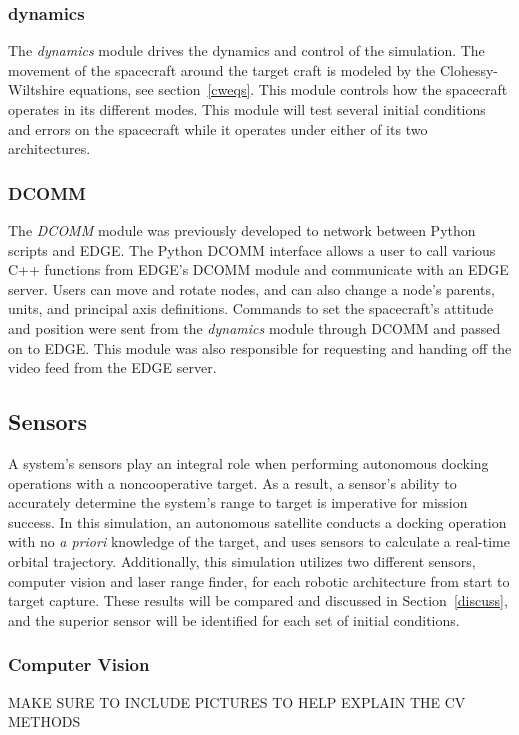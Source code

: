 \documentclass[journal, 10pt]{IEEEtran}
\begin{document}
\subsubsection{dynamics}
The \textit{dynamics} module drives the dynamics and control of the simulation. The movement of the spacecraft around the target craft is modeled by the Clohessy-Wiltshire equations, see section~\ref{cweqs}. This module controls how the spacecraft operates in its different modes. This module will test several initial conditions and errors on the spacecraft while it operates under either of its two architectures.

\subsubsection{DCOMM}
The \textit{DCOMM} module was previously developed to network between Python scripts and EDGE. The Python DCOMM interface allows a user to call various C++ functions from EDGE's DCOMM module and communicate with an EDGE server. Users can move and rotate nodes, and can also change a node's parents, units, and principal axis definitions. Commands to set the spacecraft's attitude and position were sent from the \textit{dynamics} module through DCOMM and passed on to EDGE. This module was also responsible for requesting and handing off the video feed from the EDGE server.

\subsection{Sensors}
A system's sensors play an integral role when performing autonomous docking operations with a noncooperative target. As a result, a sensor's ability to accurately determine the system's range to target is imperative for mission success. In this simulation, an autonomous satellite conducts a docking operation with no \textit{a priori} knowledge of the target, and uses sensors to calculate a real-time orbital trajectory. Additionally, this simulation utilizes two different sensors, computer vision and laser range finder, for each robotic architecture from start to target capture. These results will be compared and discussed in Section~\ref{discuss}, and the superior sensor will be identified for each set of initial conditions. 

\subsubsection{Computer Vision} \label{cv}
MAKE SURE TO INCLUDE PICTURES TO HELP EXPLAIN THE CV METHODS\\
\end{document}
